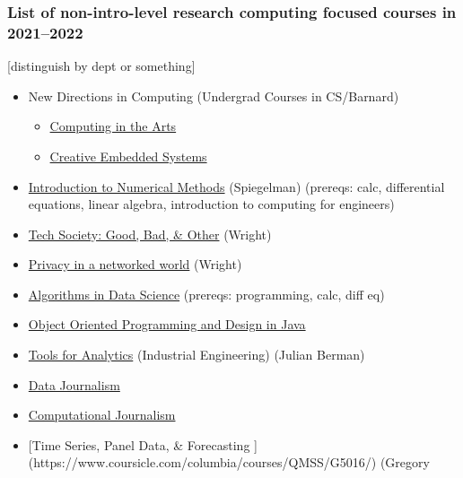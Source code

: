 \documentclass[%
  ,
  article,
  ,
  oneside
  ]{memoir}
\begin{document}
\hypertarget{list-of-non-intro-level-research-computing-focused-courses-in-20212022}{%
\subsubsection{List of non-intro-level research computing focused
courses in
2021--2022}\label{list-of-non-intro-level-research-computing-focused-courses-in-20212022}}

{[}distinguish by dept or something{]}

\begin{itemize}
\tightlist
\item
  New Directions in Computing (Undergrad Courses in CS/Barnard)

  \begin{itemize}
  \tightlist
  \item
    \href{https://www.marksantolucito.com/COMS3997/fall2021/}{Computing
    in the Arts}
  \item
    \href{https://www.marksantolucito.com/COMS3930/syllabus.pdf}{Creative
    Embedded Systems}
  \end{itemize}
\item
  \href{http://www.columbia.edu/cu/bulletin/uwb/subj/APMA/E4300-20211-001/}{Introduction
  to Numerical Methods} (Spiegelman) (prereqs: calc, differential
  equations, linear algebra, introduction to computing for engineers)
\item
  \href{https://www.coursicle.com/barnard/courses/FYSB/BC1736/}{Tech
  Society: Good, Bad, \& Other} (Wright)
\item
  \href{https://www.coursicle.com/barnard/courses/COMS/BC3420/}{Privacy
  in a networked world} (Wright)
\item
  \href{https://www.coursicle.com/columbia/courses/CSOR/W4246/}{Algorithms
  in Data Science} (prereqs: programming, calc, diff eq)
\item
  \href{https://www.coursicle.com/barnard/courses/COMS/BC3420/}{Object
  Oriented Programming and Design in Java}
\item
  \href{https://www.coursicle.com/columbia/courses/IEOR/E4501/}{Tools
  for Analytics} (Industrial Engineering) (Julian Berman)
\item
  \href{http://journalism.columbia.edu/data}{Data Journalism}
\item
  \href{http://compjournalism.com/?p=206}{Computational Journalism}
\item
  {[}Time Series, Panel Data, \& Forecasting {]}
  (https://www.coursicle.com/columbia/courses/QMSS/G5016/) (Gregory

\end{itemize}
\end{document}
